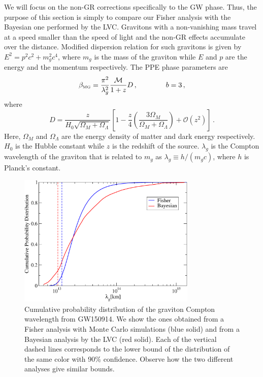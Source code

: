 \documentclass[prd,twocolumn,nofootinbib]{revtex4-1}
\newcommand\be{\begin{equation}}
\newcommand\ee{\end{equation}}
\newcommand{\lb}{\left(}
\newcommand{\rb}{\right)}
\newcommand{\MG}{{\mbox{\tiny MG}}}
\begin{document}


We will focus on the non-GR corrections specifically to the GW phase. Thus, the purpose of this section is simply to compare our Fisher analysis with the Bayesian one performed by the LVC. Gravitons with a non-vanishing mass travel at a speed smaller than the speed of light and the non-GR effects accumulate over the distance. Modified dispersion relation for such gravitons is given by $ E^2=p^2c^2+m_g^2c^4$, where $m_g$ is the mass of the graviton while $E$ and $p$ are the energy and the momentum respectively. The PPE phase parameters are~\cite{Will:1997bb}
\be
\beta_\MG=\frac{\pi^2}{\lambda_g^2}\frac{\mathcal{M}}{1+z}D\,, \qquad \qquad b=3\,,
\ee
where
\be
D=\frac{z}{H_0\sqrt{\Omega_M+\Omega_{\Lambda}}}\left[1-\frac{z}{4}\left(\frac{3\Omega_M}{\Omega_M+\Omega_{\Lambda}} \right )+\mathcal{O}(z^2)\right]\,.
\ee
Here, $\Omega_M$ and $\Omega_\Lambda$ are the energy density of matter and dark energy respectively. $H_0$ is the Hubble constant while $z$ is the redshift of the source. $\lambda_g$ is the Compton wavelength of the graviton that is related to $m_g$ as $\lambda_g\equiv h/\lb m_gc\rb$, where $h$ is Planck's constant.

\begin{figure}[htb]
\includegraphics[width=8.5cm]{graviton.pdf}
\caption{Cumulative probability distribution of the graviton Compton wavelength from GW150914. We show the ones obtained from a Fisher analysis with Monte Carlo simulations (blue solid) and from a Bayesian analysis by the LVC (red solid). Each of the vertical dashed lines corresponds to the lower bound of the distribution of the same color with 90\% confidence. Observe how the two different analyses give similar bounds.}
\label{fig:graviton}
\end{figure}
\end{document}
